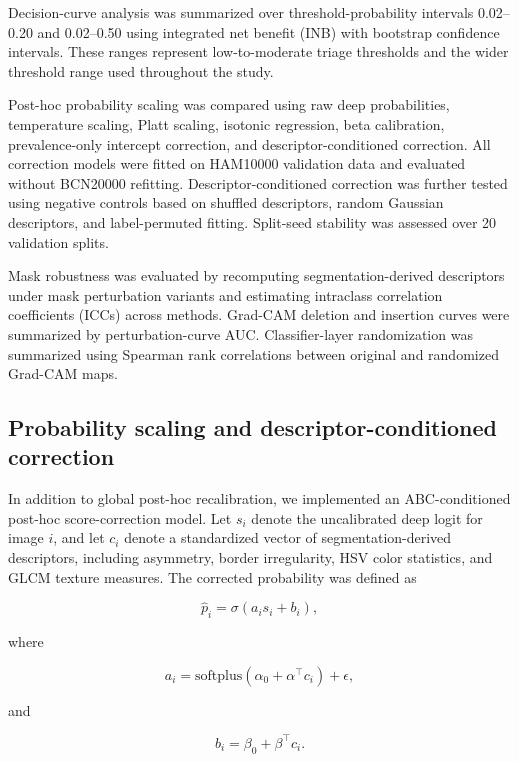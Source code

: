 \documentclass[preprint,12pt]{elsarticle}
\begin{document}
Decision-curve analysis was summarized over threshold-probability intervals 0.02--0.20 and 0.02--0.50 using integrated net benefit (INB) with bootstrap confidence intervals. These ranges represent low-to-moderate triage thresholds and the wider threshold range used throughout the study.

Post-hoc probability scaling was compared using raw deep probabilities, temperature scaling, Platt scaling, isotonic regression, beta calibration, prevalence-only intercept correction, and descriptor-conditioned correction. All correction models were fitted on HAM10000 validation data and evaluated without BCN20000 refitting. Descriptor-conditioned correction was further tested using negative controls based on shuffled descriptors, random Gaussian descriptors, and label-permuted fitting. Split-seed stability was assessed over 20 validation splits.

Mask robustness was evaluated by recomputing segmentation-derived descriptors under mask perturbation variants and estimating intraclass correlation coefficients (ICCs) across methods. Grad-CAM deletion and insertion curves were summarized by perturbation-curve AUC. Classifier-layer randomization was summarized using Spearman rank correlations between original and randomized Grad-CAM maps.

\subsection{Probability scaling and descriptor-conditioned correction}

In addition to global post-hoc recalibration, we implemented an ABC-conditioned post-hoc score-correction model. Let $s_i$ denote the uncalibrated deep logit for image $i$, and let $c_i$ denote a standardized vector of segmentation-derived descriptors, including asymmetry, border irregularity, HSV color statistics, and GLCM texture measures. The corrected probability was defined as

\begin{equation}
\hat{p}_i = \sigma(a_i s_i + b_i),
\end{equation}

where

\begin{equation}
a_i = \mathrm{softplus}(\alpha_0 + \alpha^\top c_i) + \epsilon,
\end{equation}

and

\begin{equation}
b_i = \beta_0 + \beta^\top c_i.
\end{equation}
\end{document}
